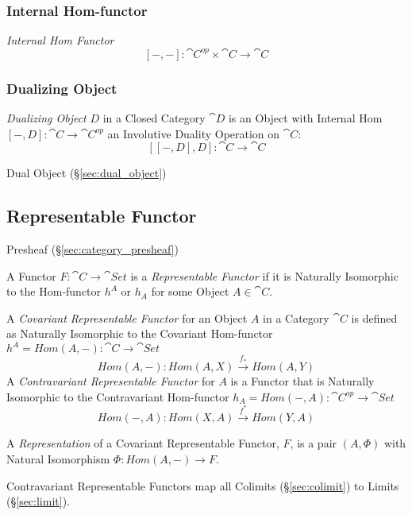 \subsubsection{Internal Hom-functor}\label{sec:internal_hom}

\emph{Internal Hom Functor}
\[
  [-,-] : \cat{C}^{op} \times \cat{C} \rightarrow \cat{C}
\]



\subsubsection{Dualizing Object}\label{sec:dualizing_object}

\emph{Dualizing Object} $D$ in a Closed Category $\cat{D}$ is an
Object with Internal Hom $[-,D]: \cat{C} \rightarrow \cat{C}^{op}$ an
Involutive Duality Operation on $\cat{C}$: %
\[
  [[-,D],D]: \cat{C} \rightarrow \cat{C}
\]

Dual Object (\S\ref{sec:dual_object})



\subsection{Representable Functor}\label{sec:representable_functor}

Presheaf (\S\ref{sec:category_presheaf})

A Functor $F : \cat{C} \rightarrow \cat{Set}$ is a
\emph{Representable Functor} if it is Naturally Isomorphic to the
Hom-functor $h^A$ or $h_A$ for some Object $A \in \cat{C}$.

A \emph{Covariant Representable Functor} for an Object $A$ in a
Category $\cat{C}$ is defined as Naturally Isomorphic to the
Covariant Hom-functor $h^A = Hom(A,-) : \cat{C} \rightarrow
\cat{Set}$
\[
  Hom(A,-) : Hom(A,X) \xrightarrow{f_*} Hom(A,Y)
\]
A \emph{Contravariant Representable Functor} for $A$ is a Functor that
is Naturally Isomorphic to the Contravariant Hom-functor $h_A =
Hom(-,A) : \cat{C^{op}} \rightarrow \cat{Set}$
\[
  Hom(-,A) : Hom(X,A) \xrightarrow{f^*} Hom(Y,A)
\]

A \emph{Representation} of a Covariant Representable Functor, $F$, is
a pair $(A, \Phi)$ with Natural Isomorphism $\Phi : Hom(A,-)
\rightarrow F$.

Contravariant Representable Functors map all Colimits
(\S\ref{sec:colimit}) to Limits (\S\ref{sec:limit}).

